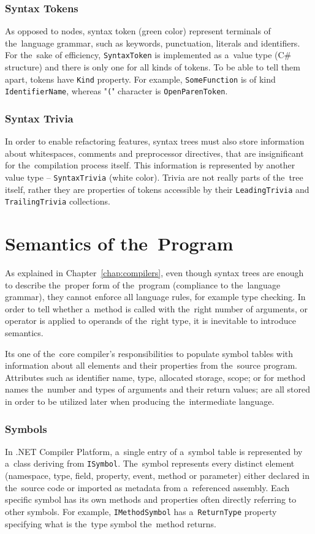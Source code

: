 \documentclass[
  digital, %
  table,   %
  lof,     %
  lot,     %
  oneside,
]{fithesis3}
\begin{document}
\subsubsection{\textbf{Syntax Tokens}}
As opposed to nodes, syntax token (green color) represent terminals of the~language grammar, such as keywords, punctuation, literals and identifiers. For the~sake of efficiency, \texttt{SyntaxToken} is implemented as a~value type (C\# structure) and there is only one for all kinds of tokens. To be able to tell them apart, tokens have \texttt{Kind} property. For example, \texttt{SomeFunction} is of kind \texttt{IdentifierName}, whereas "\texttt{(}" character is \texttt{OpenParenToken}.

\subsubsection{\textbf{Syntax Trivia}}
In order to enable refactoring features, syntax trees must also store information about whitespaces, comments and preprocessor directives, that are insignificant for the~compilation process itself. This information is represented by another value type -- \texttt{SyntaxTrivia} (white color). Trivia are not really parts of the~tree itself, rather they are properties of tokens accessible by their \texttt{LeadingTrivia} and \texttt{TrailingTrivia} collections.

\section{Semantics of the~Program}
As explained in Chapter~\ref{chap:compilers}, even though syntax trees are enough to describe the~proper form of the~program (compliance to the~language grammar), they cannot enforce all language rules, for example type checking. In order to tell whether a~method is called with the~right number of arguments, or operator is applied to operands of the~right type, it is inevitable to introduce semantics. 

Its one of the~core compiler's responsibilities to populate symbol tables with information about all elements and their properties from the~source program. Attributes such as identifier name, type, allocated storage, scope; or for method names the~number and types of arguments and their return values; are all stored in order to be utilized later when producing the~intermediate language.

\subsubsection{\textbf{Symbols}}
In .NET Compiler Platform, a~single entry of a~symbol table is represented by a~class deriving from \texttt{ISymbol}. The~symbol represents every distinct element (namespace, type, field, property, event, method or parameter) either declared in the~source code or imported as metadata from a~referenced assembly. Each specific symbol has its own methods and properties often directly referring to other symbols. For example, \texttt{IMethodSymbol} has a~\texttt{ReturnType} property specifying what is the~type symbol the~method returns.
\end{document}
